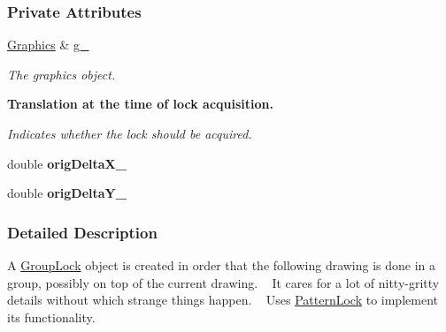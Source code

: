 \subsubsection*{Private Attributes}
\begin{DoxyCompactItemize}
\item 
\hyperlink{structslb_1_1core_1_1ui_1_1Graphics}{Graphics} \& \hyperlink{structslb_1_1core_1_1ui_1_1GroupLock_a597c8a52164d6928d9feaeb8c5dcc0cf}{g\+\_\+}\hypertarget{structslb_1_1core_1_1ui_1_1GroupLock_a597c8a52164d6928d9feaeb8c5dcc0cf}{}\label{structslb_1_1core_1_1ui_1_1GroupLock_a597c8a52164d6928d9feaeb8c5dcc0cf}

\begin{DoxyCompactList}\small\item\em The graphics object. \end{DoxyCompactList}\end{DoxyCompactItemize}
\begin{Indent}{\bf Translation at the time of lock acquisition.}\par
{\em Indicates whether the lock should be acquired. }\begin{DoxyCompactItemize}
\item 
double {\bfseries orig\+Delta\+X\+\_\+}\hypertarget{structslb_1_1core_1_1ui_1_1GroupLock_af031134beaa5282e1ee0d6c5251268b0}{}\label{structslb_1_1core_1_1ui_1_1GroupLock_af031134beaa5282e1ee0d6c5251268b0}

\item 
double {\bfseries orig\+Delta\+Y\+\_\+}\hypertarget{structslb_1_1core_1_1ui_1_1GroupLock_ad138851240fca7a62f71ff2e9ece5611}{}\label{structslb_1_1core_1_1ui_1_1GroupLock_ad138851240fca7a62f71ff2e9ece5611}

\end{DoxyCompactItemize}
\end{Indent}


\subsubsection{Detailed Description}
A \hyperlink{structslb_1_1core_1_1ui_1_1GroupLock}{Group\+Lock} object is created in order that the following drawing is done in a group, possibly on top of the current drawing. ~\newline
It cares for a lot of nitty-\/gritty details without which strange things happen. ~\newline
Uses \hyperlink{structslb_1_1core_1_1ui_1_1PatternLock}{Pattern\+Lock} to implement its functionality. 


